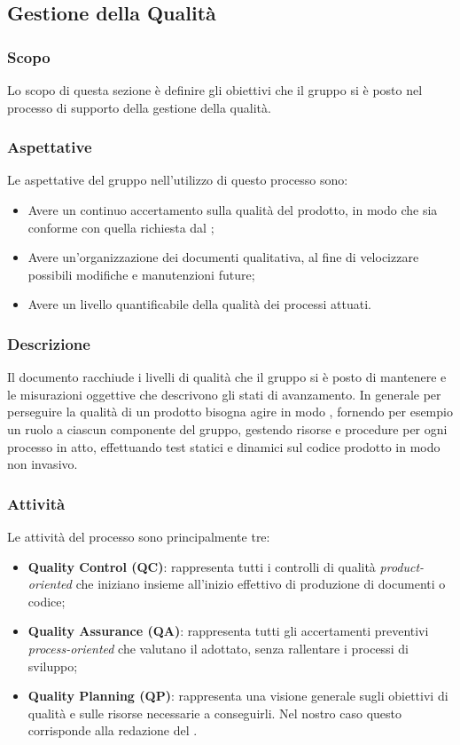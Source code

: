 \subsection{Gestione della Qualità}
\subsubsection{Scopo}
Lo scopo di questa sezione è definire gli obiettivi che il gruppo si è posto nel processo di supporto della gestione della qualità. 

\subsubsection{Aspettative}
Le aspettative del gruppo \Gruppo{} nell'utilizzo di questo processo sono:
\begin{itemize}
	\item Avere un continuo accertamento sulla qualità del prodotto, in modo che sia conforme con quella richiesta dal ;
	\item Avere un'organizzazione dei documenti qualitativa, al fine di velocizzare possibili modifiche e manutenzioni future;
	\item Avere un livello quantificabile della qualità dei processi attuati.
\end{itemize}

\subsubsection{Descrizione}
Il documento  racchiude i livelli di qualità che il gruppo si è posto di mantenere e le misurazioni oggettive che descrivono gli stati di avanzamento.
In generale per perseguire la qualità di un prodotto bisogna agire in modo , fornendo per esempio un ruolo a ciascun componente del gruppo, gestendo risorse e procedure per ogni processo in atto, effettuando test statici e dinamici sul codice prodotto in modo non invasivo.

\subsubsection{Attività}
Le attività del processo sono principalmente tre:
\begin{itemize}
	\item \textbf{Quality Control (QC)}: rappresenta tutti i controlli di qualità \textit{product-oriented} che iniziano insieme all'inizio effettivo di produzione di documenti o codice;
	\item \textbf{Quality Assurance (QA)}: rappresenta tutti gli accertamenti preventivi \textit{process-oriented} che valutano il  adottato, senza rallentare i processi di sviluppo;
	\item \textbf{Quality Planning (QP)}: rappresenta una visione generale sugli obiettivi di qualità e sulle risorse necessarie a conseguirli. Nel nostro caso questo corrisponde alla redazione del \PdQv{}.
\end{itemize}
	
